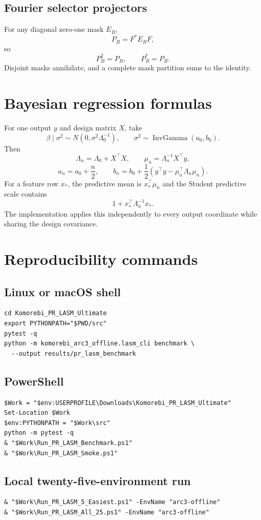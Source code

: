 \documentclass[11pt]{article}
\theoremstyle{remark}
\begin{document}
\subsection{Fourier selector projectors}
For any diagonal zero-one mask $E_B$,
\[
P_B=F^*E_BF,
\]
so
\[
P_B^2=P_B,\qquad P_B^*=P_B.
\]
Disjoint masks annihilate, and a complete mask partition sums to the identity.

\section{Bayesian regression formulas}

For one output $y$ and design matrix $X$, take
\[
\beta\mid\sigma^2\sim N(0,\sigma^2\Lambda_0^{-1}),
\qquad
\sigma^2\sim\operatorname{InvGamma}(a_0,b_0).
\]
Then
\[
\Lambda_n=\Lambda_0+X^\top X,
\qquad
\mu_n=\Lambda_n^{-1}X^\top y,
\]
\[
a_n=a_0+\frac n2,
\qquad
b_n=b_0+\frac12(y^\top y-\mu_n^\top\Lambda_n\mu_n).
\]
For a feature row $x_*$, the predictive mean is $x_*^\top\mu_n$ and the Student predictive scale contains
\[
1+x_*^\top\Lambda_n^{-1}x_*.
\]
The implementation applies this independently to every output coordinate while sharing the design covariance.

\section{Reproducibility commands}

\subsection{Linux or macOS shell}
\begin{lstlisting}
cd Komorebi_PR_LASM_Ultimate
export PYTHONPATH="$PWD/src"
pytest -q
python -m komorebi_arc3_offline.lasm_cli benchmark \
  --output results/pr_lasm_benchmark
\end{lstlisting}

\subsection{PowerShell}
\begin{lstlisting}
$Work = "$env:USERPROFILE\Downloads\Komorebi_PR_LASM_Ultimate"
Set-Location $Work
$env:PYTHONPATH = "$Work\src"
python -m pytest -q
& "$Work\Run_PR_LASM_Benchmark.ps1"
& "$Work\Run_PR_LASM_Smoke.ps1"
\end{lstlisting}

\subsection{Local twenty-five-environment run}
\begin{lstlisting}
& "$Work\Run_PR_LASM_5_Easiest.ps1" -EnvName "arc3-offline"
& "$Work\Run_PR_LASM_All_25.ps1" -EnvName "arc3-offline"
\end{lstlisting}
\end{document}
